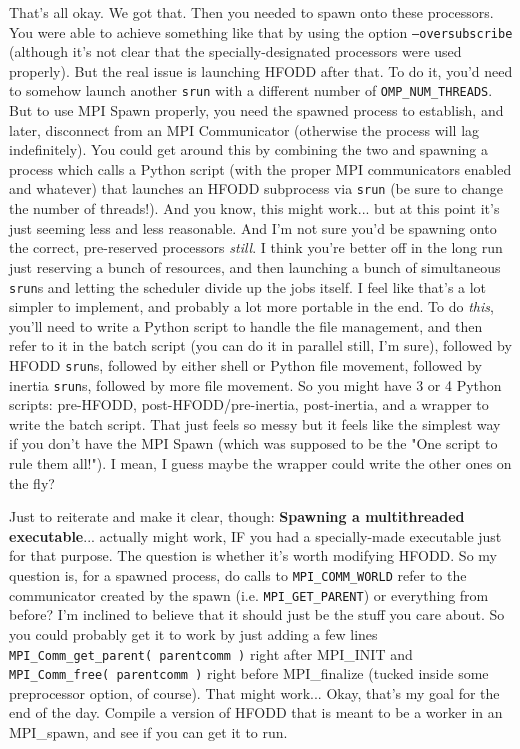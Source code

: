 \documentclass[]{report}
\begin{document}
That's all okay. We got that. Then you needed to spawn onto these processors. You were able to achieve something like that by using the option \texttt{--oversubscribe} (although it's not clear that the specially-designated processors were used properly). But the real issue is launching HFODD after that. To do it, you'd need to somehow launch another \texttt{srun} with a different number of \texttt{OMP\_NUM\_THREADS}. But to use MPI Spawn properly, you need the spawned process to establish, and later, disconnect from an MPI Communicator (otherwise the process will lag indefinitely). You could get around this by combining the two and spawning a process which calls a Python script (with the proper MPI communicators enabled and whatever) that launches an HFODD subprocess via \texttt{srun} (be sure to change the number of threads!). And you know, this might work... but at this point it's just seeming less and less reasonable. And I'm not sure you'd be spawning onto the correct, pre-reserved processors \textit{still}. I think you're better off in the long run just reserving a bunch of resources, and then launching a bunch of simultaneous \texttt{srun}s and letting the scheduler divide up the jobs itself. I feel like that's a lot simpler to implement, and probably a lot more portable in the end. To do \textit{this}, you'll need to write a Python script to handle the file management, and then refer to it in the batch script (you can do it in parallel still, I'm sure), followed by HFODD \texttt{srun}s, followed by either shell or Python file movement, followed by inertia \texttt{srun}s, followed by more file movement. So you might have 3 or 4 Python scripts: pre-HFODD, post-HFODD/pre-inertia, post-inertia, and a wrapper to write the batch script. That just feels so messy but it feels like the simplest way if you don't have the MPI Spawn (which was supposed to be the "One script to rule them all!"). I mean, I guess maybe the wrapper could write the other ones on the fly?

Just to reiterate and make it clear, though: \textbf{Spawning a multithreaded executable}... actually might work, IF you had a specially-made executable just for that purpose. The question is whether it's worth modifying HFODD. So my question is, for a spawned process, do calls to \texttt{MPI\_COMM\_WORLD} refer to the communicator created by the spawn (i.e. \texttt{MPI\_GET\_PARENT}) or everything from before? I'm inclined to believe that it should just be the stuff you care about. So you could probably get it to work by just adding a few lines \texttt{MPI\_Comm\_get\_parent( parentcomm )} right after MPI\_INIT and \texttt{MPI\_Comm\_free( parentcomm )} right before MPI\_finalize (tucked inside some preprocessor option, of course). That might work... Okay, that's my goal for the end of the day. Compile a version of HFODD that is meant to be a worker in an MPI\_spawn, and see if you can get it to run.
\end{document}
